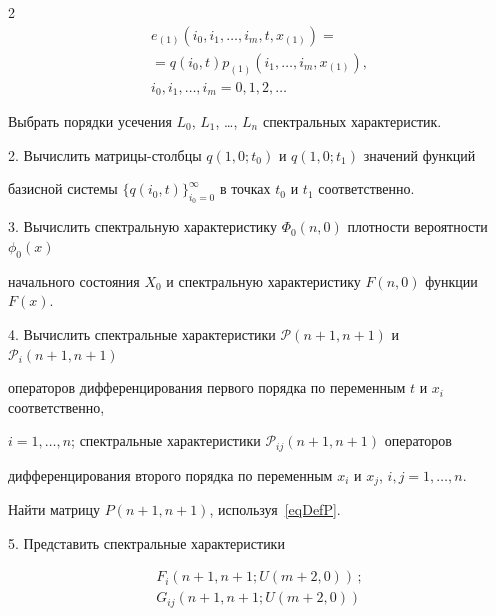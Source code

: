 \begin{multicols}{2}
\begin{multline*}


  e_{(1)}(i_0,i_1,\dots,i_m,t,x_{(1)}) ={}\\


  {}=q(i_0,t)  p_{(1)}(i_1,\dots,i_m,x_{(1)}),\\


   i_0,i_1,\dots,i_m = 0,1,2,\dots


\end{multline*}





Выбрать порядки усечения $L_0$, $L_1$, \dots, $L_n$ спект\-раль\-ных характеристик.





2. Вычислить матрицы-столбцы ${q(1,0;t_0)}$ и ${q(1,0;t_1)}$ значений функций 


базисной сис\-те\-мы $\{q(i_0,t)\}_{i_0 = 0}^\infty$ в точках $t_0$ и $t_1$ соответственно.





3. Вычислить спектральную характеристику ${\Phi_0(n,0)}$ плотности вероятности $\phi_0(x)$ 


начального состояния $X_0$ и спектральную характеристику ${F(n,0)}$ функции $F(x)$.





4.  Вычислить спектральные характеристики ${\mathcal{P}(n+1,n+1)}$ и ${\mathcal{P}_i(n+1,n+1)}$ 


операторов дифференцирования первого порядка по переменным $t$ и $x_i$ соответственно, 


${i = 1,\dots,n}$; спектральные характеристики ${\mathcal{P}_{ij}(n+1,n+1)}$ операторов 


дифференцирования второго порядка по переменным $x_i$ и $x_j$, ${i,j = 1,\dots,n}$. 


Найти матрицу ${P(n+1,n+1)}$, используя~\eqref{eqDefP}.





5. Представить спектральные характеристики 


\begin{gather*}


F_i(n+1,n+1; U(m+2,0))\,;\\ 


G_{ij}(n+1,n+1; U(m+2,0))


\end{gather*} 



\end{multicols}
